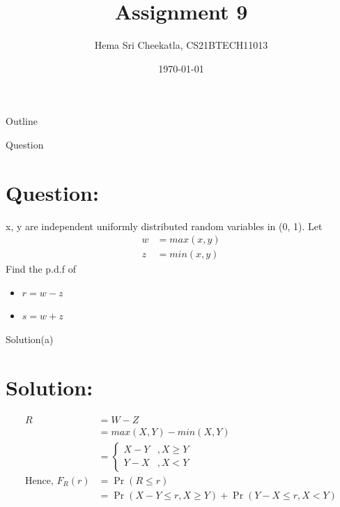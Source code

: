 \documentclass{beamer}
\title{Assignment 9}
\author{Hema Sri Cheekatla, CS21BTECH11013}
\date{\today}
\providecommand{\pr}[1]{\ensuremath{\Pr\left(#1\right)}}
\theoremstyle{remark}
\numberwithin{equation}{subsection}
\begin{document}
\begin{frame}
    \titlepage 
\end{frame}

\logo{}


\begin{frame}{Outline}
    \tableofcontents
\end{frame}

\begin{frame}{Question}
    \section{Question:}
    x, y are independent uniformly distributed random variables in (0, 1). Let
    \begin{align}
        w &= max(x,y) \\
        z &= min(x, y) 
    \end{align}
    Find the p.d.f of
    \begin{itemize}
        \item[(a)] $r=w-z$
        \item[(b)] $s = w+z$ 
    \end{itemize}
\end{frame}

\begin{frame}{Solution(a)}
    \section{Solution:}
    \begin{align}
        R &= W-Z \\
        &= max(X, Y) - min(X, Y) \\
        &= \begin{cases} X-Y &, X \geq Y \\
        Y - X &, X < Y\end{cases} \\
        \text{Hence, } F_R(r) &= \pr{R \leq r} \\
        &= \pr{X-Y \leq r, X \geq Y} + \pr{Y -X \leq r, X < Y}
    \end{align}
\end{frame}
\end{document}
